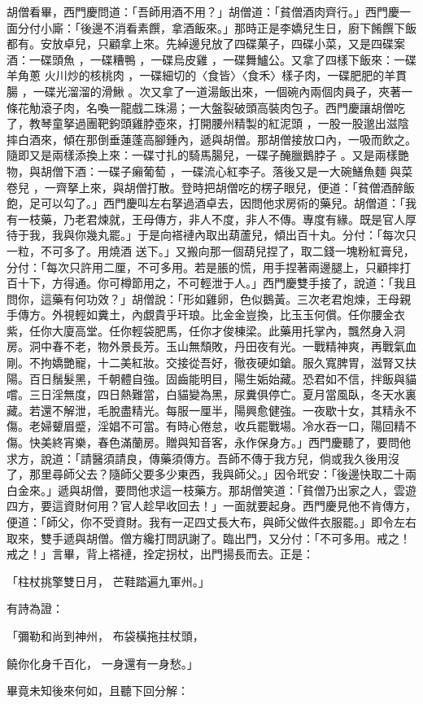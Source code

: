 胡僧看畢，西門慶問道：「吾師用酒不用？」胡僧道：「貧僧酒肉齊行。」西門慶一面分付小廝：「後邊不消看素饌，拿酒飯來。」那時正是李嬌兒生日，廚下餚饌下飯都有。安放卓兒，只顧拿上來。先綽邊兒放了四碟菓子，四碟小菜，又是四碟案酒：一碟頭魚 ，一碟糟鴨 ，一碟烏皮雞 ，一碟舞鱸公。又拿了四樣下飯來：一碟羊角蔥 火川炒的核桃肉 ，一碟細切的〈食皆〉〈食禾〉樣子肉，一碟肥肥的羊貫腸 ，一碟光溜溜的滑鰍 。次又拿了一道湯飯出來，一個碗內兩個肉員子，夾著一條花觔滾子肉，名喚一龍戲二珠湯；一大盤裂破頭高裝肉包子。西門慶讓胡僧吃了，教琴童拏過團靶鉤頭雞脖壺來，打開腰州精製的紅泥頭 ，一股一股邈出滋陰摔白酒來，傾在那倒垂蓮蓬高腳鍾內，遞與胡僧。那胡僧接放口內，一吸而飲之。隨即又是兩樣添換上來：一碟寸扎的騎馬腸兒，一碟子醃臘鵝脖子 。又是兩樣艷物，與胡僧下酒：一碟子癩葡萄 ，一碟流心紅李子。落後又是一大碗鱔魚麵 與菜卷兒 ，一齊拏上來，與胡僧打散。登時把胡僧吃的楞子眼兒，便道：「貧僧酒醉飯飽，足可以勾了。」西門慶叫左右拏過酒卓去，因問他求房術的藥兒。胡僧道：「我有一枝藥，乃老君煉就，王母傳方，非人不度，非人不傳。專度有緣。既是官人厚待于我，我與你幾丸罷。」于是向褡褳內取出葫蘆兒，傾出百十丸。分付：「每次只一粒，不可多了。用燒酒 送下。」又搬向那一個葫兒捏了，取二錢一塊粉紅膏兒，分付：「每次只許用二厘，不可多用。若是脹的慌，用手捏著兩邊腿上，只顧摔打百十下，方得通。你可樽節用之，不可輕泄于人。」西門慶雙手接了，說道：「我且問你，這藥有何功效？」胡僧說：「形如雞卵，色似鵝黃。三次老君炮煉，王母親手傳方。外視輕如糞土，內覷貴乎玕琅。比金金豈換，比玉玉何償。任你腰金衣紫，任你大廈高堂。任你輕袋肥馬，任你才俊棟梁。此藥用托掌內，飄然身入洞房。洞中春不老，物外景長芳。玉山無頹敗，丹田夜有光。一戰精神爽，再戰氣血剛。不拘嬌艷寵，十二美紅妝。交接從吾好，徹夜硬如鎗。服久寬脾胃，滋腎又扶陽。百日鬚髮黑，千朝體自強。固齒能明目，陽生姤始藏。恐君如不信，拌飯與貓嚐。三日淫無度，四日熱難當，白貓變為黑，尿糞俱停亡。夏月當風臥，冬天水裏藏。若還不解泄，毛脫盡精光。每服一厘半，陽興愈健強。一夜歇十女，其精永不傷。老婦顰眉蹙，淫娼不可當。有時心倦怠，收兵罷戰場。冷水吞一口，陽回精不傷。快美終宵樂，春色滿蘭房。贈與知音客，永作保身方。」西門慶聽了，要問他求方，說道：「請醫須請良，傳藥須傳方。吾師不傳于我方兒，倘或我久後用沒了，那里尋師父去？隨師父要多少東西，我與師父。」因令玳安：「後邊快取二十兩白金來。」遞與胡僧，要問他求這一枝藥方。那胡僧笑道：「貧僧乃出家之人，雲遊四方，要這資財何用？官人趁早收回去！」一面就要起身。西門慶見他不肯傳方，便道：「師父，你不受資財。我有一疋四丈長大布，與師父做件衣服罷。」即令左右取來，雙手遞與胡僧。僧方纔打問訊謝了。臨出門，又分付：「不可多用。戒之！戒之！」言畢，背上褡褳，拴定拐杖，出門揚長而去。正是：

「柱杖挑擎雙日月，  芒鞋踏遍九軍州。」

有詩為證：

「彌勒和尚到神州，  布袋橫拖拄杖頭，

饒你化身千百化，  一身還有一身愁。」

畢竟未知後來何如，且聽下回分解：
